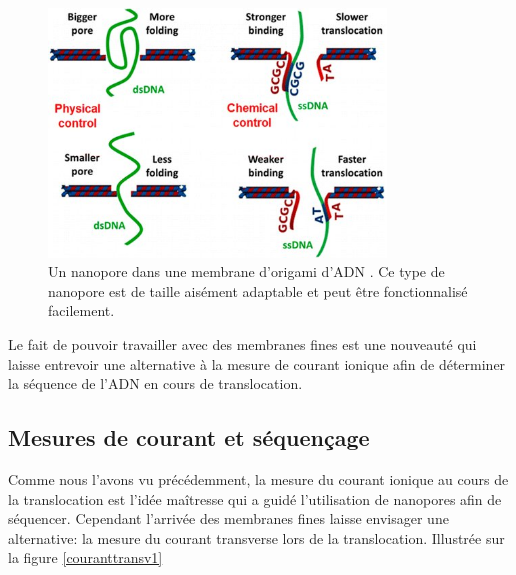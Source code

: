\begin{figure}[H]
\begin{center}
\includegraphics[width=0.8\textwidth]{origamitransloc.jpg}

\caption[Nanopore et origami d'ADN]{Un nanopore dans une membrane d'origami d'ADN \cite{HernndezAinsa2013}. Ce type de nanopore est de taille aisément adaptable et peut être fonctionnalisé facilement.}
\label{origamitransloc}
\end{center}
\end{figure}



Le fait de pouvoir travailler avec des membranes fines est une nouveauté qui laisse entrevoir une alternative à la mesure de courant ionique afin de déterminer la séquence de l'ADN en cours de translocation.





\newpage
\subsection{Mesures de courant et séquençage}

Comme nous l'avons vu précédemment, la mesure du courant ionique au cours de la translocation est l'idée maîtresse qui a guidé l'utilisation de nanopores afin de séquencer. Cependant l'arrivée des membranes fines laisse envisager une alternative: la mesure du courant transverse lors de la translocation. Illustrée sur la figure \ref{couranttransv1}


